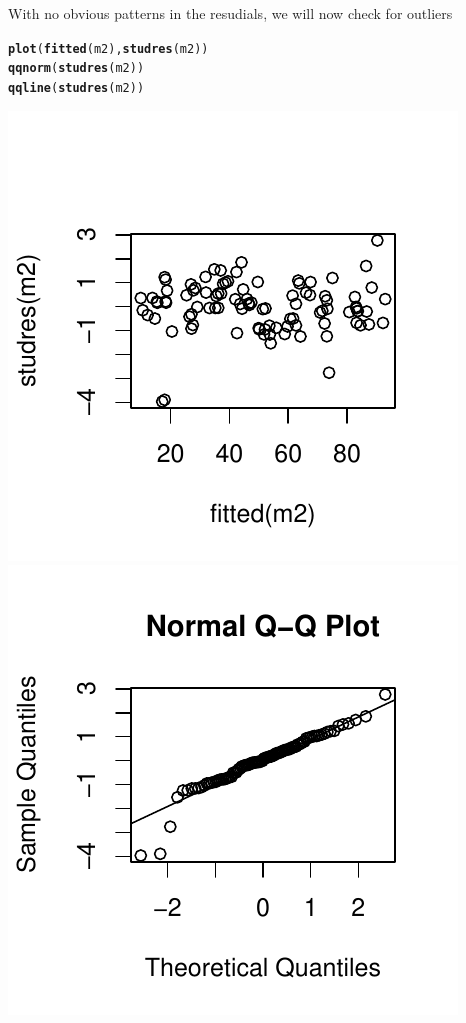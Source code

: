 \documentclass{article}\usepackage{graphicx, color}
\makeatletter
\def\maxwidth{ %
  \ifdim\Gin@nat@width>\linewidth
    \linewidth
  \else
    \Gin@nat@width
  \fi
}
\newcommand{\hlfunctioncall}[1]{\textcolor[rgb]{0.501960784313725,0,0.329411764705882}{\textbf{#1}}}%
\newenvironment{kframe}{%
 \def\at@end@of@kframe{}%
 \ifinner\ifhmode%
  \def\at@end@of@kframe{\end{minipage}}%
  \begin{minipage}{\columnwidth}%
 \fi\fi%
 \def\FrameCommand##1{\hskip\@totalleftmargin \hskip-\fboxsep
 \colorbox{shadecolor}{##1}\hskip-\fboxsep
     \hskip-\linewidth \hskip-\@totalleftmargin \hskip\columnwidth}%
 \MakeFramed {\advance\hsize-\width
   \@totalleftmargin\z@ \linewidth\hsize
   \@setminipage}}%
 {\par\unskip\endMakeFramed%
 \at@end@of@kframe}
\newenvironment{knitrout}{}{} %
\makeatother
\begin{document}
With no obvious patterns in the resudials, we will now check for outliers

\begin{knitrout}
\color{fgcolor}\begin{kframe}
\begin{alltt}
\hlfunctioncall{plot}(\hlfunctioncall{fitted}(m2), \hlfunctioncall{studres}(m2))
\hlfunctioncall{qqnorm}(\hlfunctioncall{studres}(m2))
\hlfunctioncall{qqline}(\hlfunctioncall{studres}(m2))
\end{alltt}
\end{kframe}
\includegraphics[width=\maxwidth]{figure/unnamed-chunk-41} 
\includegraphics[width=\maxwidth]{figure/unnamed-chunk-42} 

\end{knitrout}
\end{document}
